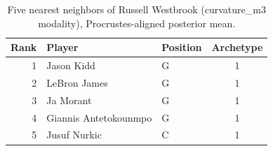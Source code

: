 \begin{table}[htbp]
  \centering\small
  \begin{tabular}{rllc}
    \toprule
    Rank & Player & Position & Archetype \\
    \midrule
    1 & Jason Kidd & G & 1 \\
    2 & LeBron James & G & 1 \\
    3 & Ja Morant & G & 1 \\
    4 & Giannis Antetokounmpo & G & 1 \\
    5 & Jusuf Nurkic & C & 1 \\
    \bottomrule
  \end{tabular}
  \caption{Five nearest neighbors of Russell Westbrook (curvature_m3 modality), Procrustes-aligned posterior mean.}
  \label{tab:Russell_Westbrook_neighbors_curvature_m3}
\end{table}

